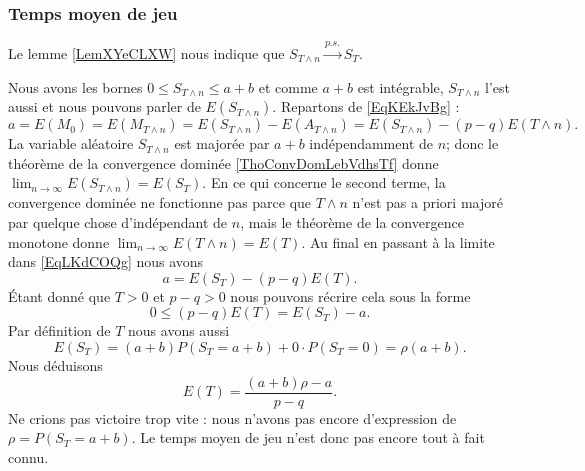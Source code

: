 \subsubsection{Temps moyen de jeu}

Le lemme \ref{LemXYeCLXW} nous indique que \( S_{T\wedge n}\stackrel{p.s.}{\longrightarrow}S_T\).

Nous avons les bornes \( 0\leq S_{T\wedge n}\leq a+b\) et comme \( a+b\) est intégrable, \( S_{T\wedge n}\) l'est aussi et nous pouvons parler de \( E(S_{T\wedge n})\). Repartons de \eqref{EqKEkJvBg} :
\begin{equation}    \label{EqLKdCOQg}
    a=E(M_0)=E(M_{T\wedge n})=E(S_{T\wedge n})-E(A_{T\wedge n})=E(S_{T\wedge n})-(p-q)E(T\wedge n).
\end{equation}
La variable aléatoire \( S_{T\wedge n}\) est majorée par \( a+b\) indépendamment de \( n\); donc le théorème de la convergence dominée \ref{ThoConvDomLebVdhsTf} donne \( \lim_{n\to \infty} E(S_{T\wedge n})=E(S_T)\). En ce qui concerne le second terme, la convergence dominée ne fonctionne pas parce que \( T\wedge n\) n'est pas a priori majoré par quelque chose d'indépendant de \( n\), mais le théorème de la convergence monotone donne \( \lim_{n\to \infty} E(T\wedge n)=E(T)\). Au final en passant à la limite dans \eqref{EqLKdCOQg} nous avons
\begin{equation}
    a=E(S_T)-(p-q)E(T).
\end{equation}
Étant donné que \( T>0\) et \( p-q>0\) nous pouvons récrire cela sous la forme
\begin{equation}
    0\leq (p-q)E(T)=E(S_T)-a.
\end{equation}
Par définition de \( T\) nous avons aussi
\begin{equation}
    E(S_T)=(a+b)P(S_T=a+b)+0\cdot P(S_T=0)=\rho(a+b).
\end{equation}
Nous déduisons
\begin{equation}    \label{EqRHUVuKv}
    E(T)=\frac{ (a+b)\rho-a }{ p-q }.
\end{equation}
Ne crions pas victoire trop vite : nous n'avons pas encore d'expression de \( \rho=P(S_T=a+b)\). Le temps moyen de jeu n'est donc pas encore tout à fait connu.

